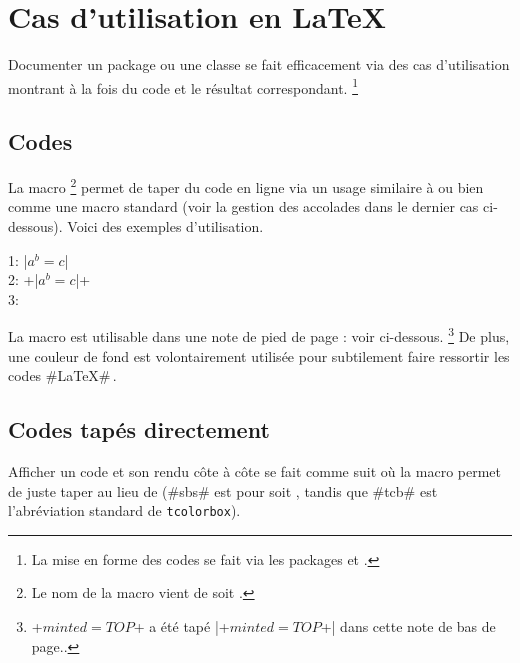 \documentclass{../main/main}
\begin{document}
\section{Cas d'utilisation en \LaTeX}
\label{tutodoc-listing-latex}

Documenter un package ou une classe se fait efficacement via des cas d'utilisation montrant à la fois du code et le résultat correspondant.%
\footnote{
    La mise en forme des codes se fait via les packages  et  .
}



\subsection{Codes }
\label{tutodoc-listing-latex-inline}

La macro 
\footnote{
    Le nom de la macro  vient de  soit .
}
permet de taper du code en ligne via un usage similaire à  ou bien comme une macro standard (voir la gestion des accolades dans le dernier cas ci-dessous).
Voici des exemples d'utilisation.


\begin{tdoclatex}
    1: \tdoclatexin|$a^b = c$|               \\
    2: \tdoclatexin+\tdoclatexin|$a^b = c$|+ \\
    3: 
\end{tdoclatex}


\begin{tdocnote}
    La macro  est utilisable dans une note de pied de page : voir ci-dessous.
    \footnote{
        \tdoclatexin+$minted = TOP$+ a été tapé \tdoclatexin|\tdoclatexin+$minted = TOP$+| dans cette note de bas de page..
    }
    De plus, une couleur de fond est volontairement utilisée pour subtilement faire ressortir les codes \tdoclatexin#\LaTeX#\,.
\end{tdocnote}



\subsection{Codes tapés directement}

\begin{tdocexa}
    Afficher un code et son rendu côte à côte se fait comme suit où la macro  permet de juste taper  au lieu de  (\tdoclatexin#sbs# est pour  soit , tandis que \tdoclatexin#tcb# est l'abréviation standard de \texttt{tcolorbox}).

\end{tdocexa}
\end{document}
